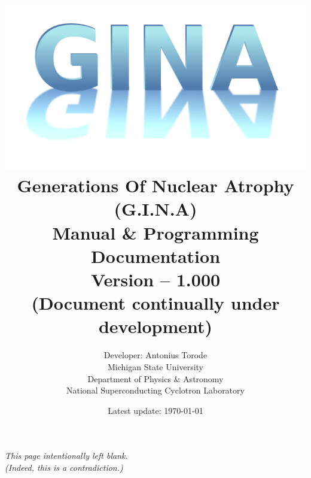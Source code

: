 \documentclass[openany,a4paper,11pt]{book}
\title{\includegraphics[scale =0.5]{./Images/gina.png} \\ Generations Of Nuclear Atrophy (G.I.N.A) \\  Manual \& Programming Documentation \\ Version -- 1.000 \\ (Document continually under development) \\ \vspace{1cm}  
}
\author{Developer: Antonius Torode \\ Michigan State University \\ Department of Physics \& Astronomy \\ National Superconducting Cyclotron Laboratory}
\date{Latest update: \today}
\begin{document}
\frontmatter
\maketitle

\tableofcontents
\newpage
\vspace*{\fill}
\begin{center}
	\textit{This page intentionally left blank. \\ (Indeed, this is a contradiction.)}
\end{center}
\vspace*{\fill}

\mainmatter
\pagestyle{fancy}
\fancyhf{}
\fancyhead[RO, LE]{\thepage}





\backmatter


\end{document}
